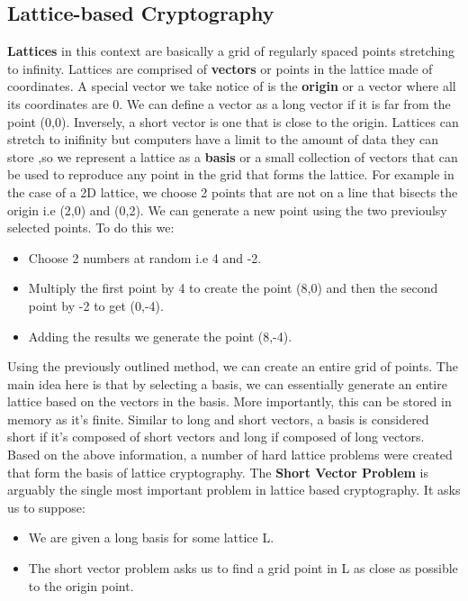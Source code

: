 \documentclass[10pt,a4paper]{IEEEtran}
\begin{document}
\subsection{Lattice-based Cryptography}
\textbf{Lattices} in this context are basically a grid of regularly spaced points stretching to infinity. Lattices are comprised of \textbf{vectors} or points in the lattice made of coordinates. A special vector we take notice of is the \textbf{origin} or a vector where all its coordinates are 0. We can define a vector as a long vector if it is far from the point (0,0). Inversely, a short vector is one that is close to the origin. Lattices can stretch to inifinity but computers have a limit to the amount of data they can store ,so we represent a lattice as a \textbf{basis} or a small collection of vectors that can be used to reproduce any point in the grid that forms the lattice.
\newline
For example in the case of a 2D lattice, we choose 2 points that are not on a line that bisects the origin i.e (2,0) and (0,2). We can generate a new point using the two previoulsy selected points. To do this we:
\begin{itemize}
\item Choose 2 numbers at random i.e 4 and -2.
\item Multiply the first point by 4 to create the point (8,0) and then the second point by -2 to get (0,-4).
\item Adding the results we generate the point (8,-4).
\end{itemize}
Using the previously outlined method, we can create an entire grid of points. The main idea here is that by selecting a basis, we can essentially generate an entire lattice based on the vectors in the basis. More importantly, this can be stored in memory as it's finite. Similar to long and short vectors, a basis is considered short if it's composed of short vectors and long if composed of long vectors.
\newline
\newline
Based on the above information, a number of hard lattice problems were created that form the basis of lattice cryptography. The \textbf{Short Vector Problem} is arguably the single most important problem in lattice based cryptography. It asks us to suppose:
\begin{itemize}
\item We are given a long basis for some lattice L.
\item The short vector problem asks us to find a grid point in L as close as possible to the origin point.
\end{itemize}
\end{document}
